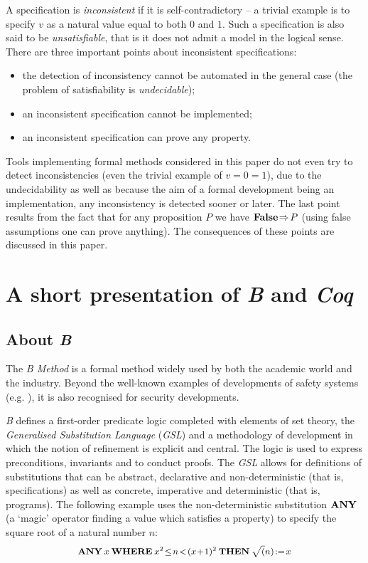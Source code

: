 \documentclass[conference]{IEEEtran}
\begin{document}
A specification is \emph{inconsistent} if it is self-contradictory -- a trivial example is to
specify {\small$v$} as a natural value equal to both {\small$0$} and {\small$1$}. Such a
specification is also said to be \emph{unsatisfiable}, that is it does not admit a model in
the logical sense. There are three important points about inconsistent specifications:
\begin{itemize}
\item the detection of inconsistency cannot be automated in the general case (the problem of
satisfiability is \emph{undecidable});
\item an inconsistent specification cannot be implemented;
\item an inconsistent specification can prove any property.
\end{itemize}
Tools implementing formal methods considered in this paper do not even try to detect
inconsistencies (even the trivial example of {\small$v\!=\!0\!=\!1$}), due to the
undecidability as well as because the aim of a formal development being an implementation, any
inconsistency is detected sooner or later. The last point results from the fact that for any
proposition {\small$P$} we have {\small$\mathbf{False}\!\Rightarrow\!P$} (using false assumptions
one can prove anything). The consequences of these points are discussed in this paper.

\section{A short presentation of \emph{B} and \emph{Coq}}\label{intro_B_Coq}

\subsection{About \emph{B}}\label{B}

The \emph{B Method} \cite{abr:1} is a formal method widely used by both the academic world and
the industry. Beyond the well-known examples of developments of safety systems (e.g.
\cite{beh:1}), it is also recognised for security developments.

\emph{B} defines a first-order predicate logic completed with elements of set theory, the
\emph{Generalised Substitution Language} (\emph{GSL}) and a methodology of development in
which the notion of refinement is explicit and central. The logic is used to express
preconditions, invariants and to conduct proofs. The \emph{GSL} allows for definitions of
substitutions that can be abstract, declarative and  non-deterministic (that is,
specifications) as well as concrete, imperative and deterministic (that is, programs). The
following example uses the non-deterministic substitution  {\small$\mathbf{ANY}$} (a `magic'
operator finding a value which satisfies a property) to specify the square root of a natural
number {\small$n$}:
\[\small\begin{array}{l}
\Cmd{ANY}\:x\:\Cmd{WHERE}\:x^2\!\leq\!n\!<\!(x\!+\!1)^2\:\Cmd{THEN}\:\sqrt(n)\!:=\!x
\end{array}\]
\end{document}
